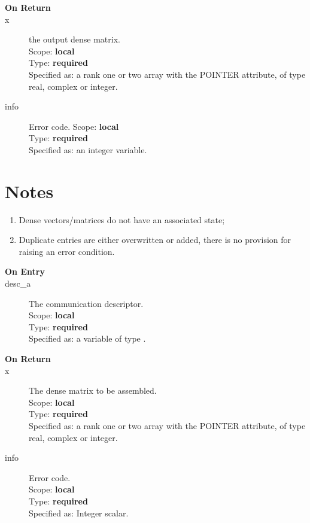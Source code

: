 \begin{description}
\item[\bf On Return]
\item[x] the output dense matrix.\\
Scope: {\bf local} \\
Type: {\bf required}\\
Specified as: a rank one or two array with the POINTER
attribute, of type real, complex or integer.\\
\item[info] Error code.
Scope: {\bf local} \\
Type: {\bf required}\\
Specified as: an integer variable.
\end{description}

\section*{Notes}
\begin{enumerate}
\item Dense vectors/matrices do not have an associated state;
\item Duplicate entries are either overwritten or added, there is no
  provision for raising an error condition. 
\end{enumerate}


%
%


\begin{description}
\item[\bf On Entry]
\item[desc\_a] The communication descriptor.\\
Scope: {\bf local} \\
Type: {\bf required}\\
Specified as: a variable of type \descdata.\\
\end{description}

\begin{description}
\item[\bf On Return]
\item[x] The dense matrix to be assembled.\\
Scope: {\bf local} \\
Type: {\bf required}\\
Specified as: a rank one or two array with the POINTER
attribute, of type real, complex or integer.\\
\item[info] Error code.\\
Scope: {\bf local} \\
Type: {\bf required}\\
Specified as: Integer scalar.\\
\end{description}
%
%

